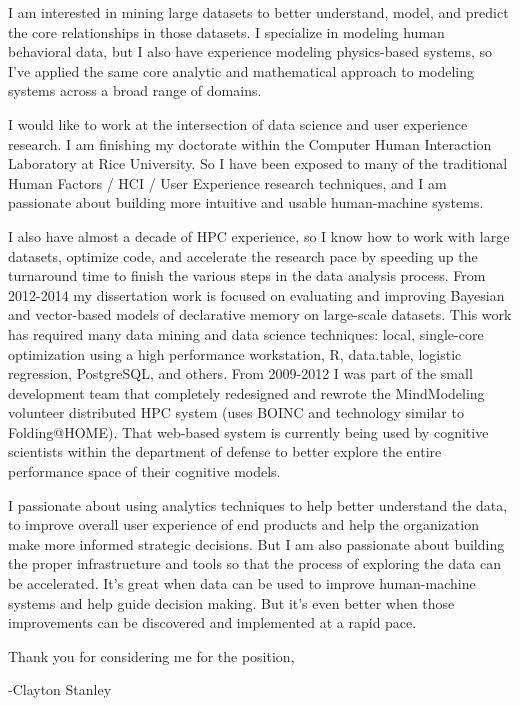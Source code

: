 \documentclass{article}
\begin{document}
I am interested in mining large datasets to better understand, model, and predict the core relationships in those datasets.
I specialize in modeling human behavioral data, but I also have experience modeling physics-based systems,
so I've applied the same core analytic and mathematical approach to modeling systems across a broad range of domains.

I would like to work at the intersection of data science and user experience research.
I am finishing my doctorate within the Computer Human Interaction Laboratory at Rice University.
So I have been exposed to many of the traditional Human Factors / HCI / User Experience research techniques, and I am passionate about building more intuitive and usable human-machine systems.

I also have almost a decade of HPC experience, so I know how to work with large datasets, optimize code,
and accelerate the research pace by speeding up the turnaround time to finish the various steps in the data analysis process. 
From 2012-2014 my dissertation work is focused on evaluating and improving Bayesian and vector-based models of declarative memory on large-scale datasets.
This work has required many data mining and data science techniques: local, single-core optimization using a high performance workstation, R, data.table, logistic regression, PostgreSQL, and others.
From 2009-2012 I was part of the small development team that completely redesigned and rewrote the MindModeling volunteer distributed HPC system (uses BOINC and technology similar to Folding@HOME).
That web-based system is currently being used by cognitive scientists within the department of defense to better explore the entire performance space of their cognitive models.

I passionate about using analytics techniques to help better understand the data, to improve overall user experience of end products and help the organization make more informed strategic decisions.
But I am also passionate about building the proper infrastructure and tools so that the process of exploring the data can be accelerated.
It's great when data can be used to improve human-machine systems and help guide decision making.
But it's even better when those improvements can be discovered and implemented at a rapid pace.

Thank you for considering me for the position,

-Clayton Stanley
\end{document}
